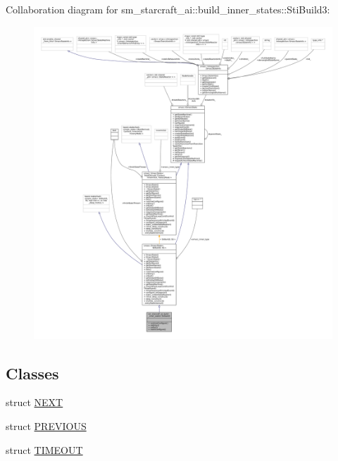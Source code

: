Collaboration diagram for sm\+\_\+starcraft\+\_\+ai\+:\+:build\+\_\+inner\+\_\+states\+:\+:Sti\+Build3\+:
\nopagebreak
\begin{figure}[H]
\begin{center}
\leavevmode
\includegraphics[width=350pt]{structsm__starcraft__ai_1_1build__inner__states_1_1StiBuild3__coll__graph}
\end{center}
\end{figure}
\subsection*{Classes}
\begin{DoxyCompactItemize}
\item 
struct \hyperlink{structsm__starcraft__ai_1_1build__inner__states_1_1StiBuild3_1_1NEXT}{N\+E\+XT}
\item 
struct \hyperlink{structsm__starcraft__ai_1_1build__inner__states_1_1StiBuild3_1_1PREVIOUS}{P\+R\+E\+V\+I\+O\+US}
\item 
struct \hyperlink{structsm__starcraft__ai_1_1build__inner__states_1_1StiBuild3_1_1TIMEOUT}{T\+I\+M\+E\+O\+UT}
\end{DoxyCompactItemize}
